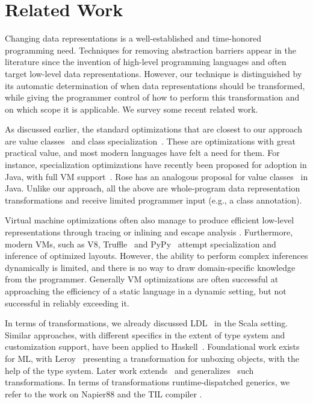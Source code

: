 \section{Related Work}
\label{sec:related}


Changing data representations is a well-established and time-honored
programming need. Techniques for removing abstraction barriers appear
in the literature since the invention of high-level programming
languages and often target low-level data representations. However,
our technique is distinguished by its automatic determination of when
data representations should be transformed, while giving the
programmer control of how to perform this transformation and on which
scope it is applicable. We survey some recent related work.

As discussed earlier, the standard optimizations that are closest to
our approach are value classes~\cite{sip-value-classes} and class
specialization~\cite{iuli-thesis,miniboxing}. These are optimizations
with great practical value, and most modern languages have felt a need
for them. For instance, specialization optimizations have recently
been proposed for adoption in Java, with full VM
support~\cite{goetz-specialization}. Rose has an analogous proposal
for value
classes~\cite{rose-value-classes-vm,rose-value-classes-tearing} in
Java. Unlike our approach, all the above are whole-program data
representation transformations and receive limited programmer input
(e.g., a class annotation).

Virtual machine optimizations often also manage to produce efficient
low-level representations through tracing \cite{tracemonkey} or
inlining and escape analysis
\cite{escape-analysis-first-paper,stadler-escape-analysis}. Furthermore,
modern VMs, such as V8,
Truffle~\cite{Wurthinger:2013:OVR:2509578.2509581} and
PyPy~\cite{PyPyTracing} attempt specialization and inference of
optimized layouts. However, the ability to perform complex inferences
dynamically is limited, and there is no way to draw domain-specific
knowledge from the programmer. Generally VM optimizations are often
successful at approaching the efficiency of a static language in a
dynamic setting, but not successful in reliably exceeding it.

In terms of transformations, we already discussed LDL~\cite{ldl} in
the Scala setting. Similar approaches, with different specifics in the
extent of type system and customization support, have been applied to
Haskell~\cite{spj-unboxed-values}. Foundational work exists for ML,
with Leroy~\cite{leroy-unboxed-objects} presenting a transformation
for unboxing objects, with the help of the type system. Later work
extends~\cite{thiemann-unboxed-objects-cps} and
generalizes~\cite{shao-flexible-representation-analysis} such
transformations. In terms of transformations runtime-dispatched
generics, we refer to the work on Napier88 \cite{morrison-napier88}
and the TIL compiler \cite{tarditi-til} \cite{harper-intensional-type-analysis}.

